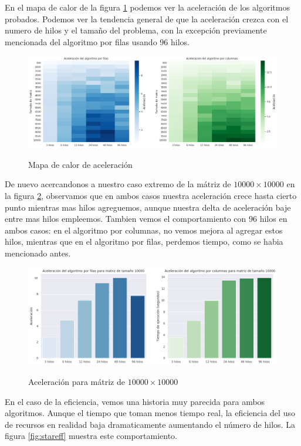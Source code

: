 \documentclass{report}
\begin{document}
En el mapa de calor de la figura \ref{fig:staraccel} podemos ver la aceleración de
los algoritmos probados. Podemos ver la tendencia general de que la aceleración
crezca con el numero de hilos y el tamaño del problema, con la excepción previamente
mencionada del algoritmo por filas usando 96 hilos.

\begin{figure}[H]
  \caption{Mapa de calor de aceleración}
\includegraphics[width=\textwidth]{stars_accel}
\label{fig:staraccel}
\end{figure}

De nuevo acercandonos a nuestro caso extremo de la mátriz de $10000 \times 10000$ en
la figura \ref{fig:staraccelbar}, observamos que en ambos casos nuestra aceleración
crece hasta cierto punto mientras mas hilos agreguemos, aunque nuestra delta de
aceleración baje entre mas hilos empleemos. Tambien vemos el comportamiento con 96
hilos en ambos casos: en el algoritmo por columnas, no vemos mejora al agregar estos
hilos, mientras que en el algoritmo por filas, perdemos tiempo, como se habia
mencionado antes.

\begin{figure}[H]
  \caption{Aceleración para mátriz de $10000 \times 10000$}
\includegraphics[width=\textwidth]{stars_accel_bar}
\label{fig:staraccelbar}
\end{figure}

En el caso de la eficiencia, vemos una historia muy parecida para ambos algoritmos.
Aunque el tiempo que toman menos tiempo real, la eficiencia del uso de recursos
en realidad baja dramaticamente aumentando el número de hilos. La figura
\ref{fig:stareff} muestra este comportamiento.
\end{document}

